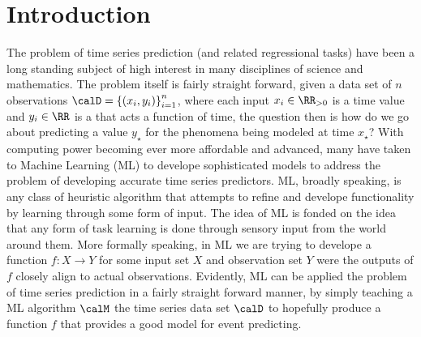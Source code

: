 \section*{Introduction}
The problem of time series prediction (and related regressional tasks) have been a long standing subject of high interest in many disciplines of science and mathematics. The problem itself is fairly straight forward, given a data set of $n$ observations $\calD = \left\{ \left( x_i , y_i \right) \right\}_{i=1}^{n}$, where each input $x_i \in \RR_{>0}$ is a time value and $y_i \in \RR$ is a that acts a function of time, the question then is how do we go about predicting a value $y_{\star}$ for the phenomena being modeled at time $x_{\star}$? With computing power becoming ever more affordable and advanced, many have taken to Machine Learning (ML) to develope sophisticated models to address the problem of developing accurate time series predictors. ML, broadly speaking, is any class of heuristic algorithm that attempts to refine and develope functionality by learning through some form of input. The idea of ML is fonded on the idea that any form of task learning is done through sensory input from the world around them. More formally speaking, in ML we are trying to develope a function $f : X \to Y$ for some input set $X$ and observation set $Y$ were the outputs of $f$ closely align to actual observations. Evidently, ML can be applied the problem of time series prediction in a fairly straight forward manner, by simply teaching a ML algorithm $\calM$ the time series data set $\calD$ to hopefully produce a function $f$ that provides a good model for event predicting.

\newpage
{}
